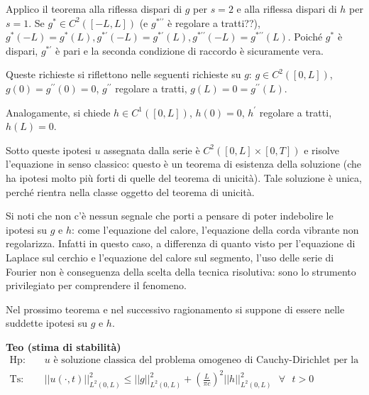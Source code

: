 \documentclass{article}
\begin{document}
Applico il teorema alla riflessa dispari di $g$ per $s=2$ e alla riflessa
dispari di $h$ per $s=1$. Se $g^{\ast }\in C^{2}\left( \left[ -L,L\right]
\right) $ (e $g^{\ast \prime \prime }$ \`{e} regolare a tratti??), $g^{\ast
}\left( -L\right) =g^{\ast }\left( L\right) ,g^{\ast \prime }\left(
-L\right) =g^{\ast \prime }\left( L\right) ,g^{\ast \prime \prime }\left(
-L\right) =g^{\ast \prime \prime }\left( L\right) $. Poich\'{e} $g^{\ast }$ 
\`{e} dispari, $g^{\ast \prime }$ \`{e} pari e la seconda condizione di
raccordo \`{e} sicuramente vera.

Queste richieste si riflettono nelle seguenti richieste su $g$: $g\in
C^{2}\left( \left[ 0,L\right] \right) $, $g\left( 0\right) =g^{\prime \prime
}\left( 0\right) =0$, $g^{\prime \prime }$ regolare a tratti, $g\left(
L\right) =0=g^{\prime \prime }\left( L\right) $.

Analogamente, si chiede $h\in C^{1}\left( \left[ 0,L\right] \right) $, $%
h\left( 0\right) =0$, $h^{\prime }$ regolare a tratti, $h\left( L\right) =0$.

Sotto queste ipotesi $u$ assegnata dalla serie \`{e} $C^{2}\left( \left[ 0,L%
\right] \times \left[ 0,T\right] \right) $ e risolve l'equazione in senso
classico: questo \`{e} un teorema di esistenza della soluzione (che ha
ipotesi molto pi\`{u} forti di quelle del teorema di unicit\`{a}). Tale
soluzione \`{e} unica, perch\'{e} rientra nella classe oggetto del teorema
di unicit\`{a}.

Si noti che non c'\`{e} nessun segnale che porti a pensare di poter
indebolire le ipotesi su $g$ e $h$: come l'equazione del calore, l'equazione
della corda vibrante non regolarizza. Infatti in questo caso, a differenza
di quanto visto per l'equazione di Laplace sul cerchio e l'equazione del
calore sul segmento, l'uso delle serie di Fourier non \`{e} conseguenza
della scelta della tecnica risolutiva: sono lo strumento privilegiato per
comprendere il fenomeno.

Nel prossimo teorema e nel successivo ragionamento si suppone di essere
nelle suddette ipotesi su $g$ e $h$.

\textbf{Teo (stima di stabilit\`{a})}%
\begin{eqnarray*}
\text{Hp}\text{: } &&u\text{ \`{e} soluzione classica del problema omogeneo
di Cauchy-Dirichlet per la corda vibrante} \\
\text{Ts}\text{: } &&\left\vert \left\vert u\left( \cdot ,t\right)
\right\vert \right\vert _{L^{2}\left( 0,L\right) }^{2}\leq \left\vert
\left\vert g\right\vert \right\vert _{L^{2}\left( 0,L\right) }^{2}+\left( 
\frac{L}{\pi c}\right) ^{2}\left\vert \left\vert h\right\vert \right\vert
_{L^{2}\left( 0,L\right) }^{2}\text{ }\forall \text{ }t>0
\end{eqnarray*}
\end{document}
